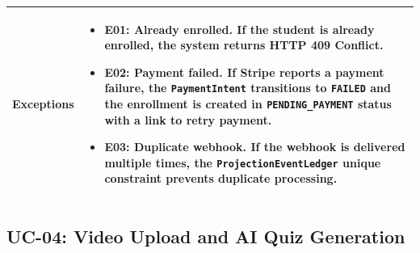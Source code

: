 \begin{longtable}{p{3cm}p{10cm}}
  \textbf{Exceptions} &
  \begin{itemize}
    \item \textbf{E01: Already enrolled.} If the student is already enrolled, the system returns HTTP 409 Conflict.
    \item \textbf{E02: Payment failed.} If Stripe reports a payment failure, the \texttt{PaymentIntent} transitions to \texttt{FAILED} and the enrollment is created in \texttt{PENDING\_PAYMENT} status with a link to retry payment.
    \item \textbf{E03: Duplicate webhook.} If the webhook is delivered multiple times, the \texttt{ProjectionEventLedger} unique constraint prevents duplicate processing.
  \end{itemize} \\
  \bottomrule
\end{longtable}

\subsection{UC-04: Video Upload and AI Quiz Generation}

